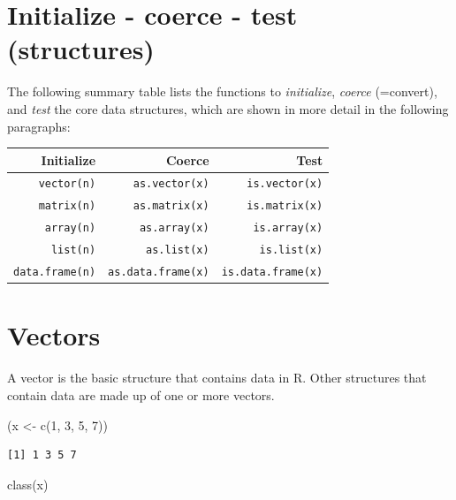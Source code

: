 \documentclass[
]{book}
\newenvironment{Shaded}{\begin{snugshade}}{\end{snugshade}}
\newcommand{\DecValTok}[1]{\textcolor[rgb]{0.00,0.00,0.81}{#1}}
\newcommand{\FunctionTok}[1]{\textcolor[rgb]{0.00,0.00,0.00}{#1}}
\newcommand{\NormalTok}[1]{#1}
\newcommand{\OtherTok}[1]{\textcolor[rgb]{0.56,0.35,0.01}{#1}}
\begin{document}
\hypertarget{initialize---coerce---test-structures}{%
\section{Initialize - coerce - test (structures)}\label{initialize---coerce---test-structures}}

The following summary table lists the functions to \emph{initialize}, \emph{coerce} (=convert), and \emph{test} the core data structures, which are shown in more detail in the following paragraphs:

\begin{longtable}[]{@{}rrr@{}}
\toprule
\textbf{Initialize} & \textbf{Coerce} & \textbf{Test}\tabularnewline
\midrule
\endhead
\texttt{vector(n)} & \texttt{as.vector(x)} & \texttt{is.vector(x)}\tabularnewline
\texttt{matrix(n)} & \texttt{as.matrix(x)} & \texttt{is.matrix(x)}\tabularnewline
\texttt{array(n)} & \texttt{as.array(x)} & \texttt{is.array(x)}\tabularnewline
\texttt{list(n)} & \texttt{as.list(x)} & \texttt{is.list(x)}\tabularnewline
\texttt{data.frame(n)} & \texttt{as.data.frame(x)} & \texttt{is.data.frame(x)}\tabularnewline
\bottomrule
\end{longtable}

\hypertarget{vectors}{%
\section{Vectors}\label{vectors}}

A vector is the basic structure that contains data in R. Other structures that contain data are made up of one or more vectors.

\begin{Shaded}
\begin{Highlighting}[]
\NormalTok{(x }\OtherTok{\textless{}{-}} \FunctionTok{c}\NormalTok{(}\DecValTok{1}\NormalTok{, }\DecValTok{3}\NormalTok{, }\DecValTok{5}\NormalTok{, }\DecValTok{7}\NormalTok{))}
\end{Highlighting}
\end{Shaded}

\begin{verbatim}
[1] 1 3 5 7
\end{verbatim}

\begin{Shaded}
\begin{Highlighting}[]
\FunctionTok{class}\NormalTok{(x)}
\end{Highlighting}
\end{Shaded}
\end{document}
